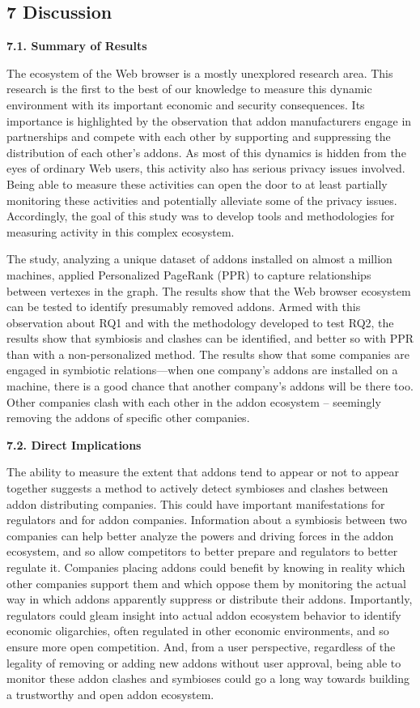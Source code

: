 \documentclass{article} %
\begin{document}
\subsection{7  Discussion}

\noindent 

\noindent \textbf{7.1. Summary of Results}

The ecosystem of the Web browser is a mostly unexplored research area. This research is the first to the best of our knowledge to measure this dynamic environment with its important economic and security consequences. Its importance is highlighted by the observation that addon manufacturers engage in partnerships and compete with each other by supporting and suppressing the distribution of each other's addons. As most of this dynamics is hidden from the eyes of ordinary Web users, this activity also has serious privacy issues involved. Being able to measure these activities can open the door to at least partially monitoring these activities and potentially alleviate some of the privacy issues. Accordingly, the goal of this study was to develop tools and methodologies for measuring activity in this complex ecosystem. 

The study, analyzing a unique dataset of addons installed on almost a million machines, applied Personalized PageRank (PPR) to capture relationships between vertexes in the graph. The results show that the Web browser ecosystem can be tested to identify presumably removed addons. Armed with this observation about RQ1 and with the methodology developed to test RQ2, the results show that symbiosis and clashes can be identified, and better so with PPR than with a non-personalized method. The results show that some companies are engaged in symbiotic relations---when one company's addons are installed on a machine, there is a good chance that another company's addons will be there too. Other companies clash with each other in the addon ecosystem -- seemingly removing the addons of specific other companies. 

\noindent \textbf{7.2. Direct Implications }

The ability to measure the extent that addons tend to appear or not to appear together suggests a method to actively detect symbioses and clashes between addon distributing companies. This could have important manifestations for regulators and for addon companies. Information about a symbiosis between two companies can help better analyze the powers and driving forces in the addon ecosystem, and so allow competitors to better prepare and regulators to better regulate it. Companies placing addons could benefit by knowing in reality which other companies support them and which oppose them by monitoring the actual way in which addons apparently suppress or distribute their addons. Importantly, regulators could gleam insight into actual addon ecosystem behavior to identify economic oligarchies, often regulated in other economic environments, and so ensure more open competition. And, from a user perspective, regardless of the legality of removing or adding new addons without user approval, being able to monitor these addon clashes and symbioses could go a long way towards building a trustworthy and open addon ecosystem. 
\end{document}
